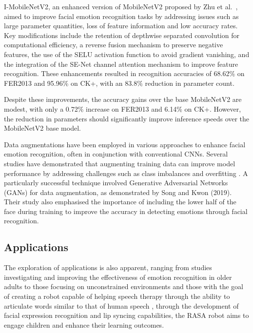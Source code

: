 I-MobileNetV2, an enhanced version of MobileNetV2 proposed by Zhu et al.\ \cite{Zhu2024-gy}, aimed to improve facial emotion recognition tasks by addressing issues such as large parameter quantities, loss of feature information and low accuracy rates. Key modifications include the retention of depthwise separated convolution for computational efficiency, a reverse fusion mechanism to preserve negative features, the use of the SELU activation function to avoid gradient vanishing, and the integration of the SE-Net channel attention mechanism to improve feature recognition. These enhancements resulted in recognition accuracies of 68.62\% on FER2013 and 95.96\% on CK+, with an 83.8\% reduction in parameter count.

Despite these improvements, the accuracy gains over the base MobileNetV2 are modest, with only a 0.72\% increase on FER2013 and 6.14\% on CK+. However, the reduction in parameters should significantly improve inference speeds over the MobileNetV2 base model.

Data augmentations have been employed in various approaches to enhance facial emotion recognition, often in conjunction with conventional CNNs. Several studies have demonstrated that augmenting training data can improve model performance by addressing challenges such as class imbalances and overfitting \cite{Saxena2022-sr} \cite{Ruiz-Garcia2018-uy}. A particularly successful technique involved Generative Adversarial Networks (GANs) for data augmentation, as demonstrated by Song and Kwon (2019). Their study also emphasised the importance of including the lower half of the face during training to improve the accuracy in detecting emotions through facial recognition.

\subsection{Applications}

The exploration of applications is also apparent, ranging from studies investigating and improving the effectiveness of emotion recognition in older adults \cite{Ma2019-ng} to those focusing on unconstrained environments \cite{Webb2020-bq} and those with the goal of creating a robot capable of helping speech therapy through the ability to articulate words similar to that of human speech \cite{Esfandbod2023-eq}, through the development of facial expression recognition and lip syncing capabilities, the RASA robot aims to engage children and enhance their learning outcomes.

